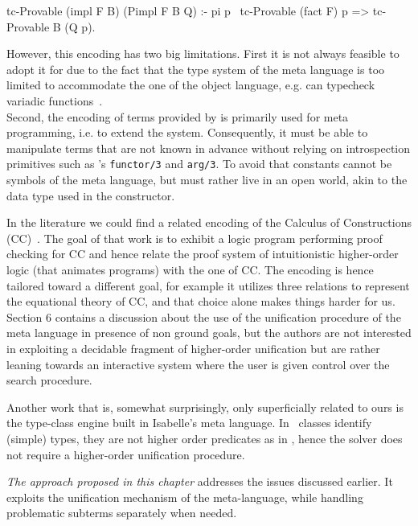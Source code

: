 \begin{elpicode}
  tc-Provable ({{impl}} F B) ({{Pimpl}} F B Q) :-
    pi p \ tc-Provable ({{fact}} F) p => tc-Provable B (Q p).
\end{elpicode}

\noindent
However, this encoding has two big limitations. First it is
not always feasible to adopt it for \rocq due to the fact that the type system
of the meta language is too limited to accommodate the one of the object language,
e.g. \rocq can typecheck variadic functions~\cite{cpdt}. \\
Second, the encoding of \rocq terms provided by \elpi is primarily used for meta
programming, i.e. to extend the \rocq system. Consequently, it must be able to
manipulate terms that are not known in advance
without relying on introspection primitives such as \prolog's
\texttt{functor/3} and \texttt{arg/3}. To avoid that constants 
cannot be symbols of the meta language, but must rather
live in
an open world, akin to the  data type used in the \mcon
constructor.

In the literature we could find a related encoding of the Calculus of
Constructions (CC)~\cite{felty93}. The goal of that work is to exhibit
a logic program performing proof checking for CC and hence relate the
proof system of intuitionistic higher-order logic (that animates \lprolog
programs) with the one of CC. The encoding is hence tailored
toward a different goal, for example it utilizes three relations to represent the
equational theory of CC, and that choice alone makes things harder for us.
Section 6 contains a discussion about the use of the
unification procedure of the meta language in presence of non ground goals, but
the authors are not interested in exploiting a decidable fragment of
higher-order unification but are rather leaning towards an interactive
system where the user is given
control over the search procedure.

Another work that is, somewhat surprisingly, only superficially related to ours is the
type-class engine built in Isabelle's meta language. In~\cite{wenzel97-tc}
classes identify (simple) types, they are not higher order predicates
as in \rocq, hence the solver does not require a higher-order unification
procedure.

\emph{The approach proposed in this chapter} addresses the issues
discussed earlier. It exploits the unification mechanism of the
meta-language, while handling problematic subterms separately
when needed.

